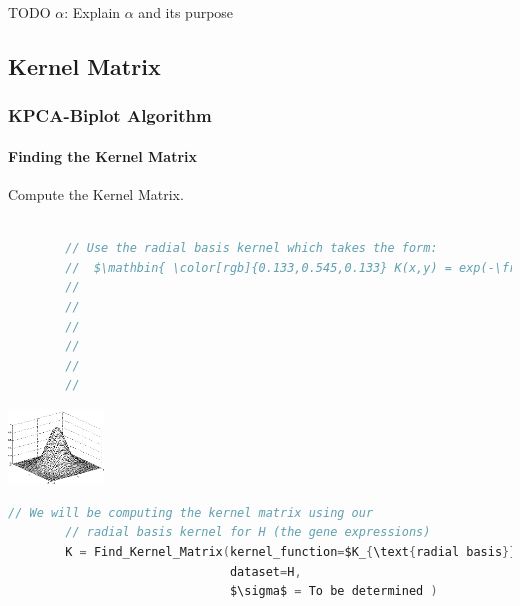 \documentclass[serif]{beamer}
\newcommand{\codepause}{\pause \vspace{-0.165in} }
\begin{document}
	\begin{frame}
		\begin{block}{TODO $\alpha$:}
			Explain $\alpha$ and its purpose
		\end{block}
	\end{frame}
	
	\subsection{Kernel Matrix}
	
	\begin{frame}[t, fragile]
		\frametitle{KPCA-Biplot Algorithm}
		\framesubtitle{Finding the Kernel Matrix}
		
		Compute the Kernel Matrix.
		
		\begin{lstlisting}[mathescape, language=C]
		
		// Use the radial basis kernel which takes the form:
		//  $\mathbin{ \color[rgb]{0.133,0.545,0.133} K(x,y) = exp(-\frac{{ \left\| x-y \right\|  }^{ 2 }}{2\sigma^{2}})}$
		// 
		// 
		//
		//
		//
		//
		\end{lstlisting}
		\vspace{-1.10in}
		\begin{center}
		\includegraphics[width=1.0in]{images/rbf_kernel}	
		\end{center}
		\vspace{-0.07in}
		\codepause
		\begin{lstlisting}[mathescape, language=C]
		// We will be computing the kernel matrix using our
		// radial basis kernel for H (the gene expressions)
		K = Find_Kernel_Matrix(kernel_function=$K_{\text{radial basis}}(x,y)$,
		                       dataset=H,
		                       $\sigma$ = To be determined )
		
		\end{lstlisting}

	\end{frame}
	
\end{document}
